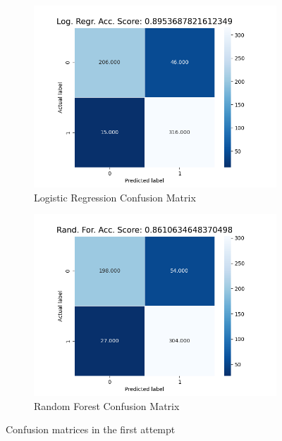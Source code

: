 \documentclass[12pt, conference]{IEEEtran}
\begin{document}
\begin{figure}[t]
    \centering
    \begin{subfigure}[b]{.5\linewidth}
        \centering
        \includegraphics[width=\linewidth]{resources/confusion_matrix_basic_features_logreg.png}
        \caption{Logistic Regression Confusion Matrix}
        \label{fig:confusion-matrix-first-attempt-randfor}
    \end{subfigure}%
    \begin{subfigure}[b]{.5\linewidth}
        \centering
        \includegraphics[width=\linewidth]{resources/confusion_matrix_basic_features_randfor.png}
        \caption{Random Forest Confusion Matrix}
        \label{fig:confusion-matrix-first-attempt-logreg}
    \end{subfigure}
    \caption{Confusion matrices in the first attempt}
    \label{fig:confusion-matrix-first-attempt}
\end{figure}
\end{document}
